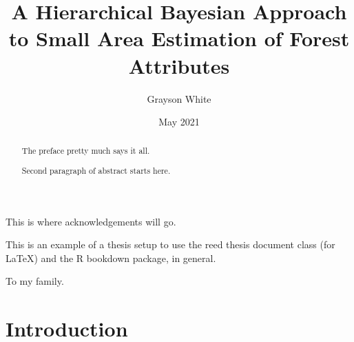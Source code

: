 \documentclass[12pt,twoside]{reedthesis}
\title{A Hierarchical Bayesian Approach to Small Area Estimation of Forest Attributes}
\author{Grayson White}
\date{May 2021}
\begin{document}
  \maketitle

\frontmatter %
\pagestyle{empty} %
  \begin{acknowledgements}
    This is where acknowledgements will go.
  \end{acknowledgements}
  \begin{preface}
    This is an example of a thesis setup to use the reed thesis document class
    (for LaTeX) and the R bookdown package, in general.
  \end{preface}
  \hypersetup{linkcolor=black}
  \setcounter{secnumdepth}{2}
  \setcounter{tocdepth}{2}
  \tableofcontents

  \listoftables

  \listoffigures
  \begin{abstract}
    The preface pretty much says it all.

    \par

    Second paragraph of abstract starts here.
  \end{abstract}
  \begin{dedication}
    To my family.
  \end{dedication}
\mainmatter %
\pagestyle{fancyplain} %

\hypertarget{introduction}{%
\chapter*{Introduction}\label{introduction}}
\end{document}
